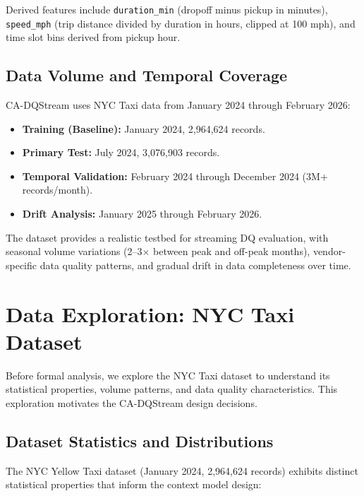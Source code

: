 Derived features include \texttt{duration\_min} (dropoff minus pickup in minutes), \texttt{speed\_mph} (trip distance divided by duration in hours, clipped at 100 mph), and time slot bins derived from pickup hour.

\subsection{Data Volume and Temporal Coverage}

CA-DQStream uses NYC Taxi data from January 2024 through February 2026:

\begin{itemize}
    \item \textbf{Training (Baseline):} January 2024, 2,964,624 records.
    \item \textbf{Primary Test:} July 2024, 3,076,903 records.
    \item \textbf{Temporal Validation:} February 2024 through December 2024 (3M+ records/month).
    \item \textbf{Drift Analysis:} January 2025 through February 2026.
\end{itemize}

The dataset provides a realistic testbed for streaming DQ evaluation, with seasonal volume variations (2--3$\times$ between peak and off-peak months), vendor-specific data quality patterns, and gradual drift in data completeness over time.

\section{Data Exploration: NYC Taxi Dataset}

Before formal analysis, we explore the NYC Taxi dataset to understand its statistical properties, volume patterns, and data quality characteristics. This exploration motivates the CA-DQStream design decisions.

\subsection{Dataset Statistics and Distributions}

The NYC Yellow Taxi dataset (January 2024, 2,964,624 records) exhibits distinct statistical properties that inform the context model design:

